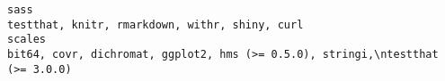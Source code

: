 \documentclass[
  letterpaper,
  DIV=11,
  numbers=noendperiod]{scrreprt}
\begin{document}
\begin{verbatim}
sass                                                                                                                                                                                                                                                                                                                                                                                                                                                                                                                                                                                                                                                                                                                                                                                                                                                                                                                                                                                                                                                                                                                                                                                                                                                           testthat, knitr, rmarkdown, withr, shiny, curl
scales                                                                                                                                                                                                                                                                                                                                                                                                                                                                                                                                                                                                                                                                                                                                                                                                                                                                                                                                                                                                                                                                                                                                                                                                                         bit64, covr, dichromat, ggplot2, hms (>= 0.5.0), stringi,\ntestthat (>= 3.0.0)

\end{verbatim}
\end{document}
